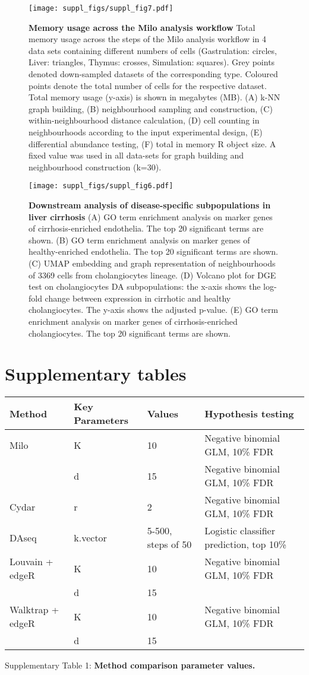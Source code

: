 \documentclass[
]{article}
\begin{document}
\begin{figure}
\centering
\texttt{[image: suppl\_figs/suppl\_fig7.pdf]}
\caption{\label{fig:sup-fig-7}\textbf{Memory usage across the Milo analysis workflow}
Total memory usage across the steps of the Milo analysis workflow in 4 data sets containing different numbers of cells (Gastrulation: circles, Liver: triangles, Thymus: crosses, Simulation: squares). Grey points denoted down-sampled datasets of the corresponding type. Coloured points denote the total number of cells for the respective dataset. Total memory usage (y-axis) is shown in megabytes (MB). (A) k-NN graph building, (B) neighbourhood sampling and construction, (C) within-neighbourhood distance calculation, (D) cell counting in neighbourhoods according to the input experimental design, (E) differential abundance testing, (F) total in memory R object size. A fixed value was used in all data-sets for graph building and neighbourhood construction (k=30).}
\end{figure}




\begin{figure}
\centering
\texttt{[image: suppl\_figs/suppl\_fig6.pdf]}
\caption{\label{fig:sup-fig-6}\textbf{Downstream analysis of disease-specific subpopulations in liver cirrhosis}
(A) GO term enrichment analysis on marker genes of cirrhosis-enriched endothelia. The top 20 significant terms are shown.
(B) GO term enrichment analysis on marker genes of healthy-enriched endothelia. The top 20 significant terms are shown.
(C) UMAP embedding and graph representation of neighbourhoods of 3369 cells from cholangiocytes lineage.
(D) Volcano plot for DGE test on cholangiocytes DA subpopulations: the x-axis shows the log-fold change between expression in cirrhotic and healthy cholangiocytes. The y-axis shows the adjusted p-value.
(E) GO term enrichment analysis on marker genes of cirrhosis-enriched cholangiocytes. The top 20 significant terms are shown.}
\end{figure}








\newpage

\hypertarget{supplementary-tables}{%
\section{Supplementary tables}\label{supplementary-tables}}

\begin{longtable}[]{@{}llll@{}}
\toprule
Method & Key Parameters & Values & Hypothesis testing\tabularnewline
\midrule
\endhead
Milo & K & 10 & Negative binomial GLM, 10\% FDR\tabularnewline
& d & 15 & Negative binomial GLM, 10\% FDR\tabularnewline
Cydar & r & 2 & Negative binomial GLM, 10\% FDR\tabularnewline
DAseq & k.vector & 5-500, steps of 50 & Logistic classifier prediction, top 10\%\tabularnewline
Louvain + edgeR & K & 10 & Negative binomial GLM, 10\% FDR\tabularnewline
& d & 15 &\tabularnewline
Walktrap + edgeR & K & 10 & Negative binomial GLM, 10\% FDR\tabularnewline
& d & 15 &\tabularnewline
\bottomrule
\end{longtable}

Supplementary Table 1: \textbf{Method comparison parameter values.}

\newpage
\end{document}
